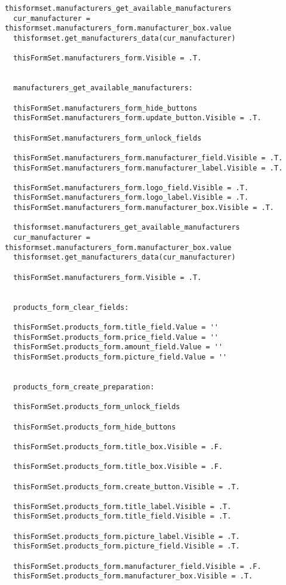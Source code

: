 \begin{lstlisting}[caption=crud\_formset\_procedures]
  thisformset.manufacturers_get_available_manufacturers
  cur_manufacturer = thisformset.manufacturers_form.manufacturer_box.value
  thisformset.get_manufacturers_data(cur_manufacturer)

  thisFormSet.manufacturers_form.Visible = .T.


  manufacturers_get_available_manufacturers:

  thisFormSet.manufacturers_form_hide_buttons
  thisFormSet.manufacturers_form.update_button.Visible = .T.

  thisFormSet.manufacturers_form_unlock_fields

  thisFormSet.manufacturers_form.manufacturer_field.Visible = .T.
  thisFormSet.manufacturers_form.manufacturer_label.Visible = .T.

  thisFormSet.manufacturers_form.logo_field.Visible = .T.
  thisFormSet.manufacturers_form.logo_label.Visible = .T.
  thisFormSet.manufacturers_form.manufacturer_box.Visible = .T.

  thisformset.manufacturers_get_available_manufacturers
  cur_manufacturer = thisformset.manufacturers_form.manufacturer_box.value
  thisformset.get_manufacturers_data(cur_manufacturer)

  thisFormSet.manufacturers_form.Visible = .T.


  products_form_clear_fields:

  thisFormSet.products_form.title_field.Value = ''
  thisFormSet.products_form.price_field.Value = ''
  thisFormSet.products_form.amount_field.Value = ''
  thisFormSet.products_form.picture_field.Value = ''


  products_form_create_preparation:

  thisFormSet.products_form_unlock_fields

  thisFormSet.products_form_hide_buttons

  thisFormSet.products_form.title_box.Visible = .F.

  thisFormSet.products_form.title_box.Visible = .F.

  thisFormSet.products_form.create_button.Visible = .T.

  thisFormSet.products_form.title_label.Visible = .T.
  thisFormSet.products_form.title_field.Visible = .T.

  thisFormSet.products_form.picture_label.Visible = .T.
  thisFormSet.products_form.picture_field.Visible = .T.

  thisFormSet.products_form.manufacturer_field.Visible = .F.
  thisFormSet.products_form.manufacturer_box.Visible = .T.


\end{lstlisting}
